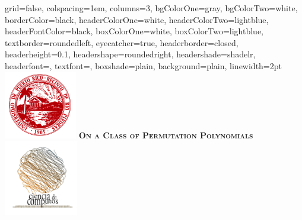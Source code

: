 \documentclass[landscape,final,paperwidth=48in,paperheight=36in]{baposter}
\begin{document}
\begin{poster}%
  {
  grid=false,
  colspacing=1em,
  columns=3,
  bgColorOne=gray,
  bgColorTwo=white,
  borderColor=black,
  headerColorOne=white,
  headerColorTwo=lightblue,
  headerFontColor=black,
  boxColorOne=white,
  boxColorTwo=lightblue,
  textborder=roundedleft,
  eyecatcher=true,
  headerborder=closed,
  headerheight=0.1\textheight,
  headershape=roundedright,
  headershade=shadelr,
  headerfont=\Large\textsc, %
  textfont=\large{\setlength{\parindent}{1.5em}},
  boxshade=plain,
  background=plain,
  linewidth=2pt
  }
  {\includegraphics[height=8em,keepaspectratio=true]{images/logo_uprrp}} 
  {\bf\textsc{On a Class of Permutation Polynomials}\vspace{0.1em}}
  {}
  {%
    \includegraphics[height=9em,keepaspectratio=true]{images/logo_ccom}
  }

    \newcommand{\colouredcircle}{%
      \tikz{\useasboundingbox (-0.2em,-0.32em) rectangle(0.2em,0.32em); \draw[draw=black,fill=lightblue,line width=0.03em] (0,0) circle(0.18em);}}


\end{poster}
\end{document}
